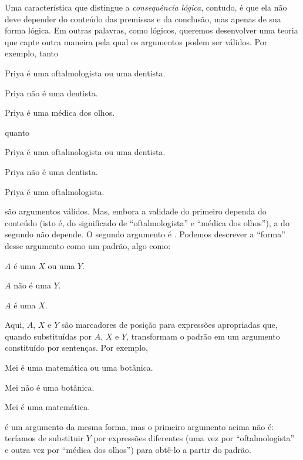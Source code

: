 Uma característica que distingue a \emph{consequência lógica}, contudo, é que ela não deve depender do conteúdo das premissas e da conclusão, mas apenas de sua forma lógica. Em outras palavras, como lógicos, queremos desenvolver uma teoria que capte outra maneira pela qual os argumentos podem ser válidos. Por exemplo, tanto
\begin{earg}
	\item[] Priya é uma oftalmologista ou uma dentista.
	\item[] Priya não é uma dentista.
	\item[\texttherefore] Priya é uma médica dos olhos.
\end{earg}
quanto
\begin{earg}
	\item[] Priya é uma oftalmologista ou uma dentista.
	\item[] Priya não é uma dentista.
	\item[\texttherefore] Priya é uma oftalmologista.
\end{earg}
são argumentos válidos. Mas, embora a validade do primeiro dependa do conteúdo (isto é, do significado de \textquotedblleft oftalmologista\textquotedblright{} e \textquotedblleft médica dos olhos\textquotedblright{}), a do segundo não depende. O segundo argumento é . Podemos descrever a \textquotedblleft forma\textquotedblright{} desse argumento como um padrão, algo como:
\begin{earg}
	\item[] $A$ é uma $X$ ou uma $Y$.
	\item[] $A$ não é uma $Y$.
	\item[\texttherefore] $A$ é uma $X$.
\end{earg}
Aqui, $A$, $X$ e $Y$ são marcadores de posição para expressões apropriadas que, quando substituídas por $A$, $X$ e $Y$, transformam o padrão em um argumento constituído por sentenças. Por exemplo,
\begin{earg}
	\item[] Mei é uma matemática ou uma botânica.
	\item[] Mei não é uma botânica.
	\item[\texttherefore] Mei é uma matemática.
\end{earg}
é um argumento da mesma forma, mas o primeiro argumento acima não é: teríamos de substituir $Y$ por expressões diferentes (uma vez por \textquotedblleft oftalmologista\textquotedblright{} e outra vez por \textquotedblleft médica dos olhos\textquotedblright{}) para obtê-lo a partir do padrão.

